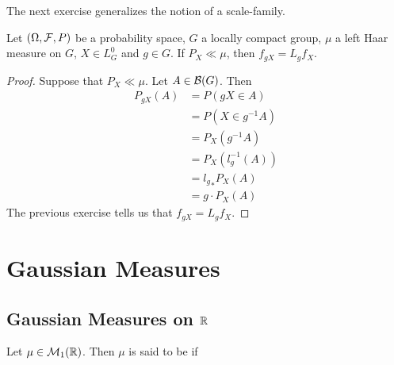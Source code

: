 \documentclass{book}
\begin{document}
	\begin{note}
	The next exercise generalizes the notion of a scale-family.
	\end{note}
	
	\begin{ex}
	Let $(\Omega, \mathcal{F}, P)$ be a probability space, $G$ a locally compact group, $\mu$ a left Haar measure on $G$, $X \in L^0_G$ and $g \in G$. If $P_X \ll \mu$, then $f_{gX} = L_g f_X$.
	\end{ex}
	
	\begin{proof}
	Suppose that $P_X \ll \mu$. Let $A \in \mathcal{B}(G)$. Then 
	\begin{align*}
	P_{gX}(A) 
	&= P(gX \in A) \\
	&= P(X \in g^{-1}A) \\
	&= P_X(g^{-1}A) \\
	&= P_X(l_g^{-1}(A)) \\
	&= {l_g}_*P_X(A) \\
	&= g \cdot P_X(A)
	\end{align*}
	The previous exercise tells us that $f_{gX} = L_g f_X$.
	\end{proof}
	
	
	
	
	
	
	
	
	
	
	
	
	
	
	
	
	
	
	
	
	
	
	
	
	
	
	
	
	
	
	
	
	
	
	
	
	
	
	\newpage
	\chapter{Gaussian Measures}
	
	\section{Gaussian Measures on $\mathbb{R}$}
	
	\begin{defn}
		Let $\mu \in \mathcal{M}_1(\mathbb{R})$. Then $\mu$ is said to be  if 
	\end{defn}
	
\end{document}
